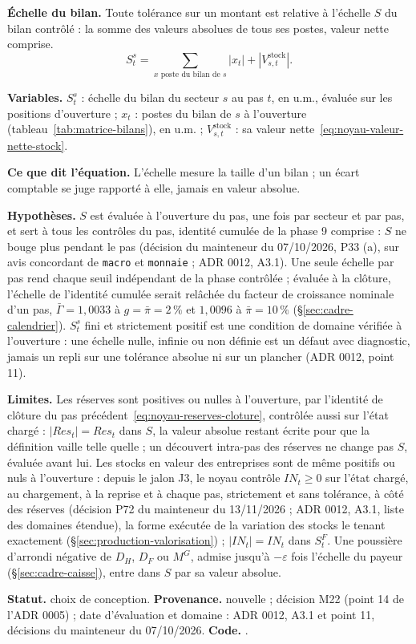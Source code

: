 \documentclass[11pt,a4paper]{article}
\newcommand{\variables}{\par\noindent\textbf{Variables.} }
\newcommand{\sens}{\par\noindent\textbf{Ce que dit l'équation.} }
\newcommand{\hyp}{\par\noindent\textbf{Hypothèses.} }
\newcommand{\limites}{\par\noindent\textbf{Limites.} }
\newcommand{\code}[1]{\texttt{\detokenize{#1}}}
\newcommand{\tracabilite}[3]{\par\smallskip\noindent\textbf{Statut.} #1. \textbf{Provenance.} #2. \textbf{Code.} \code{#3}.}
\begin{document}
\textbf{Échelle du bilan.} Toute tolérance sur un montant est relative à l'échelle $S$ du bilan contrôlé : la somme des valeurs absolues de tous ses postes, valeur nette comprise.
\begin{equation}\label{eq:noyau-echelle-bilan}
S^s_t = \sum_{x \text{ poste du bilan de } s} |x_t| + |V^{\mathrm{stock}}_{s,t}| .
\end{equation}
\begin{lecture}
\variables $S^s_t$ : échelle du bilan du secteur $s$ au pas $t$, en u.m., évaluée sur les positions d'ouverture ; $x_t$ : postes du bilan de $s$ à l'ouverture (tableau~\ref{tab:matrice-bilans}), en u.m. ; $V^{\mathrm{stock}}_{s,t}$ : sa valeur nette~\eqref{eq:noyau-valeur-nette-stock}.
\sens L'échelle mesure la taille d'un bilan ; un écart comptable se juge rapporté à elle, jamais en valeur absolue.
\hyp $S$ est évaluée à l'ouverture du pas, une fois par secteur et par pas, et sert à tous les contrôles du pas, identité cumulée de la phase 9 comprise : $S$ ne bouge plus pendant le pas (décision du mainteneur du 07/10/2026, P33 (a), sur avis concordant de \texttt{macro} et \texttt{monnaie} ; ADR 0012, A3.1). Une seule échelle par pas rend chaque seuil indépendant de la phase contrôlée ; évaluée à la clôture, l'échelle de l'identité cumulée serait relâchée du facteur de croissance nominale d'un pas, $\bar\Gamma = 1{,}0033$ à $g = \bar\pi = 2\,\%$ et $1{,}0096$ à $\bar\pi = 10\,\%$ (\S\ref{sec:cadre-calendrier}). $S^s_t$ fini et strictement positif est une condition de domaine vérifiée à l'ouverture : une échelle nulle, infinie ou non définie est un défaut avec diagnostic, jamais un repli sur une tolérance absolue ni sur un plancher (ADR 0012, point 11).
\limites Les réserves sont positives ou nulles à l'ouverture, par l'identité de clôture du pas précédent~\eqref{eq:noyau-reserves-cloture}, contrôlée aussi sur l'état chargé : $|\mathit{Res}_t| = \mathit{Res}_t$ dans $S$, la valeur absolue restant écrite pour que la définition vaille telle quelle ; un découvert intra-pas des réserves ne change pas $S$, évaluée avant lui. Les stocks en valeur des entreprises sont de même positifs ou nuls à l'ouverture : depuis le jalon J3, le noyau contrôle $\mathit{IN}_t \ge 0$ sur l'état chargé, au chargement, à la reprise et à chaque pas, strictement et sans tolérance, à côté des réserves (décision P72 du mainteneur du 13/11/2026 ; ADR 0012, A3.1, liste des domaines étendue), la forme exécutée de la variation des stocks le tenant exactement (\S\ref{sec:production-valorisation}) ; $|\mathit{IN}_t| = \mathit{IN}_t$ dans $S^F_t$. Une poussière d'arrondi négative de $D_H$, $D_F$ ou $M^G$, admise jusqu'à $-\varepsilon$ fois l'échelle du payeur (\S\ref{sec:cadre-caisse}), entre dans $S$ par sa valeur absolue.
\tracabilite{choix de conception}{nouvelle ; décision M22 (point 14 de l'ADR 0005) ; date d'évaluation et domaine : ADR 0012, A3.1 et point 11, décisions du mainteneur du 07/10/2026}{nations.noyau.identites.echelle_bilan}
\end{lecture}
\end{document}
